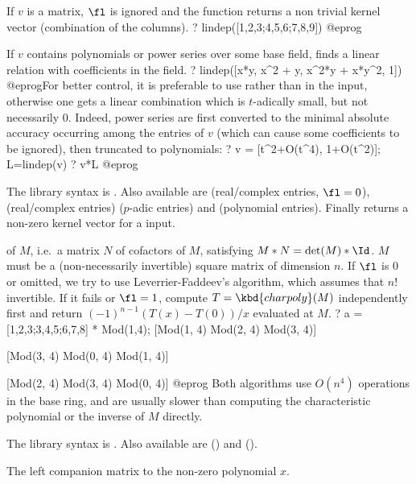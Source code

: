 If $v$ is a matrix, $\fl$ is ignored and the function returns a non trivial
kernel vector (combination of the columns).
\bprog
? lindep([1,2,3;4,5,6;7,8,9])
@eprog

If $v$ contains polynomials or power series over some base field, finds a
linear relation with coefficients in the field.
\bprog
? lindep([x*y, x^2 + y, x^2*y + x*y^2, 1])
@eprog\noindent For better control, it is preferable to use  rather
than  in the input, otherwise one gets a linear combination which is
$t$-adically small, but not necessarily $0$. Indeed, power series are first
converted to the minimal absolute accuracy occurring among the entries of $v$
(which can cause some coefficients to be ignored), then truncated to
polynomials:
\bprog
? v = [t^2+O(t^4), 1+O(t^2)]; L=lindep(v)
? v*L
@eprog

The library syntax is .
Also available are  (real/complex entries,
$\fl=0$),  (real/complex entries)
 ($p$-adic entries) and
 (polynomial entries).
Finally  returns a non-zero kernel vector for a
 input.

\label{se:matadjoint}
 of $M$, i.e.~a matrix $N$
of cofactors of $M$, satisfying $M*N=\det(M)*\Id$. $M$ must be a
(non-necessarily invertible) square matrix of dimension $n$.
If $\fl$ is 0 or omitted, we try to use Leverrier-Faddeev's algorithm,
which assumes that $n!$ invertible. If it fails or $\fl = 1$,
compute $T = \kbd{charpoly}(M)$ independently first and return
$(-1)^{n-1} (T(x)-T(0))/x$ evaluated at $M$.
\bprog
? a = [1,2,3;3,4,5;6,7,8] * Mod(1,4);
[Mod(1, 4) Mod(2, 4) Mod(3, 4)]

[Mod(3, 4) Mod(0, 4) Mod(1, 4)]

[Mod(2, 4) Mod(3, 4) Mod(0, 4)]
@eprog\noindent
Both algorithms use $O(n^4)$ operations in the base ring, and are usually
slower than computing the characteristic polynomial or the inverse of $M$
directly.

The library syntax is .
Also available are
 () and
 ().

\label{se:matcompanion}
The left companion matrix to the non-zero polynomial $x$.

